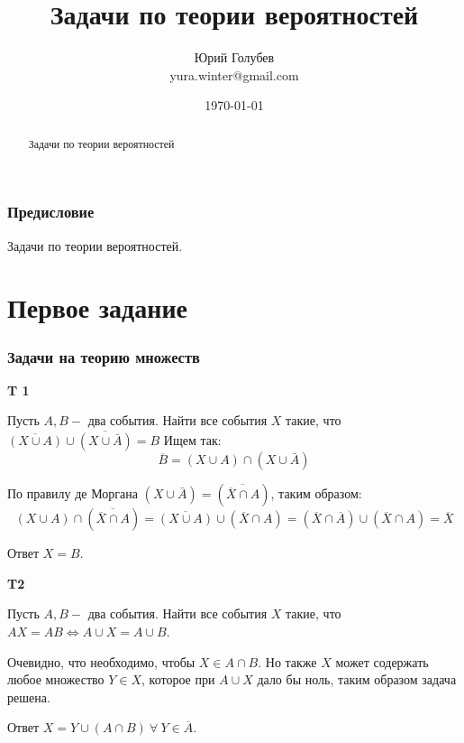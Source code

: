 \documentclass[a4paper,12pt]{article} %
\author{Юрий Голубев\\ yura.winter@gmail.com }
\title{Задачи по теории вероятностей}
\date{\today}
\begin{document}
\maketitle

\begin{abstract}
Задачи по теории вероятностей
\end{abstract}
\tableofcontents

\section*{Предисловие}

Задачи по теории вероятностей.





\clearpage
\part{Первое задание}


\section{Задачи на теорию множеств}

\begin{example}\textbf{T 1}


Пусть $A, B-$ два события. Найти все события $X$ такие, что 
$\overline{(X \cup A)} \cup \overline{(X \cup \bar{A})}=B$
Ищем так:
$$\overline{B}=
(X \cup A) \cap (X \cup \bar{A})
$$

По правилу де Моргана $(X \cup \bar{A})= (\overline{\overline{X} \cap A})$, таким образом:
$$
(X \cup A) \cap (\overline{\overline{X} \cap A}) =\overline{(X \cup A)} \cup (\overline{X} \cap A) =(\overline{X} \cap \overline{A}) \cup (\overline{X} \cap A)= \overline{X}
$$


Ответ $ X=B$.

\end{example}


\begin{example}\textbf{T2}

Пусть $A, B-$ два события. Найти все события $X$ такие, что $A X=A B \Longleftrightarrow  A \cup X=A \cup B$.

Очевидно, что необходимо, чтобы $X\in A\cap B$. Но также $X$ может содержать любое множество $ Y\in X $, которое при $A \cup X$ дало бы ноль, таким образом задача решена.

Ответ $ X=Y \cup (A\cap B)  \ \forall \ Y\in \overline{A}$.


\end{example}
\end{document}
